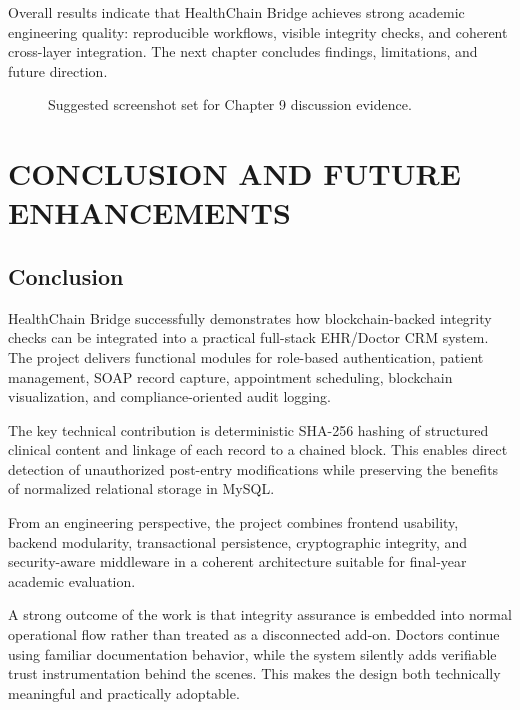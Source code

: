 \documentclass[12pt,a4paper]{report}
\begin{document}
Overall results indicate that HealthChain Bridge achieves strong academic engineering quality: reproducible workflows, visible integrity checks, and coherent cross-layer integration. The next chapter concludes findings, limitations, and future direction.

\begin{figure}[H]
\centering
{}
\caption{Suggested screenshot set for Chapter 9 discussion evidence.}
\label{fig:placeholder-testing-ui-set}
\end{figure}

\chapter{CONCLUSION AND FUTURE ENHANCEMENTS}

\section{Conclusion}

HealthChain Bridge successfully demonstrates how blockchain-backed integrity checks can be integrated into a practical full-stack EHR/Doctor CRM system. The project delivers functional modules for role-based authentication, patient management, SOAP record capture, appointment scheduling, blockchain visualization, and compliance-oriented audit logging.

The key technical contribution is deterministic SHA-256 hashing of structured clinical content and linkage of each record to a chained block. This enables direct detection of unauthorized post-entry modifications while preserving the benefits of normalized relational storage in MySQL.

From an engineering perspective, the project combines frontend usability, backend modularity, transactional persistence, cryptographic integrity, and security-aware middleware in a coherent architecture suitable for final-year academic evaluation.

A strong outcome of the work is that integrity assurance is embedded into normal operational flow rather than treated as a disconnected add-on. Doctors continue using familiar documentation behavior, while the system silently adds verifiable trust instrumentation behind the scenes. This makes the design both technically meaningful and practically adoptable.
\end{document}
